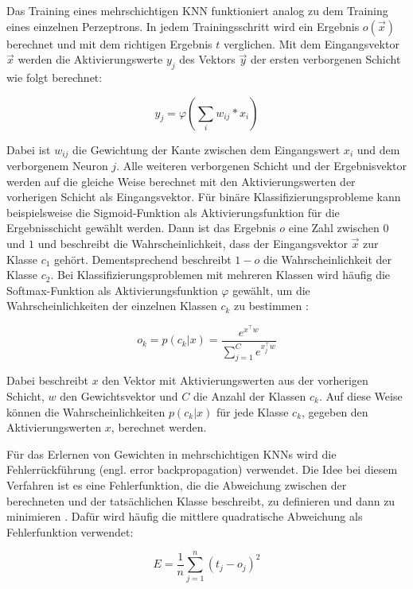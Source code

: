 Das Training eines mehrschichtigen \ac{KNN} funktioniert analog zu dem Training eines einzelnen Perzeptrons. In jedem Trainingsschritt wird ein Ergebnis $o(\vec{x})$ berechnet und mit dem richtigen Ergebnis $t$ verglichen. Mit dem Eingangsvektor $\vec{x}$ werden die Aktivierungswerte $y_j$ des Vektors  $\vec{y}$ der ersten verborgenen Schicht wie folgt berechnet:

\begin{equation}
y_j = \varphi(\sum_i{w_{ij}*x_i})
\end{equation}

Dabei ist $w_{ij}$ die Gewichtung der Kante zwischen dem Eingangswert $x_i$ und dem verborgenem Neuron $j$. Alle weiteren verborgenen Schicht und der Ergebnisvektor werden auf die gleiche Weise berechnet mit den Aktivierungswerten der vorherigen Schicht als Eingangsvektor. Für binäre Klassifizierungsprobleme kann beispielsweise die Sigmoid-Funktion als Aktivierungsfunktion für die Ergebnisschicht gewählt werden. Dann ist das Ergebnis $o$ eine Zahl zwischen $0$ und $1$ und beschreibt die Wahrscheinlichkeit, dass der Eingangsvektor $\vec{x}$ zur Klasse $c_1$ gehört. Dementsprechend beschreibt $1-o$ die Wahrscheinlichkeit der Klasse $c_2$. Bei Klassifizierungsproblemen mit mehreren Klassen wird häufig die Softmax-Funktion als Aktivierungsfunktion $\varphi$ gewählt, um die Wahrscheinlichkeiten der einzelnen Klassen $c_k$ zu bestimmen \cite{bridle1990probabilistic}:

\begin{equation}
o_k = p(c_k|x) = \frac{e^{x^\top w}}{\sum_{j=1}^Ce^{x_j^\top w}}
\end{equation}

Dabei beschreibt $x$ den Vektor mit Aktivierungswerten aus der vorherigen Schicht, $w$ den Gewichtsvektor und $C$ die Anzahl der Klassen $c_k$. Auf diese Weise können die Wahrscheinlichkeiten $p(c_k|x)$ für jede Klasse $c_k$, gegeben den Aktivierungswerten $x$, berechnet werden.

Für das Erlernen von Gewichten in mehrschichtigen \acp{KNN} wird die Fehlerrückführung (engl. error backpropagation) verwendet. Die Idee bei diesem Verfahren ist es eine Fehlerfunktion, die die Abweichung zwischen der berechneten und der tatsächlichen Klasse beschreibt, zu definieren und dann zu minimieren \cite{bishop2006pattern}. Dafür wird häufig die mittlere quadratische Abweichung als Fehlerfunktion verwendet:

\begin{equation}
E = \frac{1}{n}\sum_{j=1}^n(t_j-o_j)^2
\end{equation}

